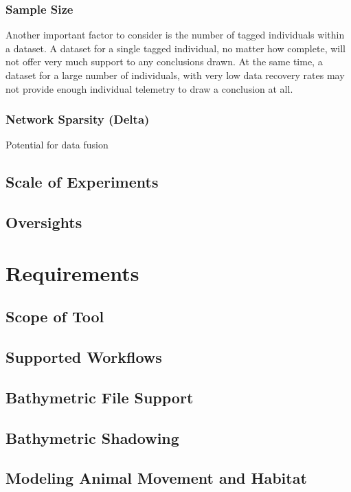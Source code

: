 \subsubsection{Sample Size}
\label{sampleSize}
Another important factor to consider is the number of tagged individuals within a dataset.  A dataset for a single tagged individual, no matter how complete, will not offer very much support to any conclusions drawn.  At the same time, a dataset for a large number of individuals, with very low data recovery rates may not provide enough individual telemetry to draw a conclusion at all.

\subsubsection{Network Sparsity (Delta)}
\label{delta}

Potential for data fusion




\subsection{Scale of Experiments}


\subsection{Oversights}


\section{Requirements}
\subsection{Scope of Tool}
\subsection{Supported Workflows}
\subsection{Bathymetric File Support}
\subsection{Bathymetric Shadowing}
\subsection{Modeling Animal Movement and Habitat}
